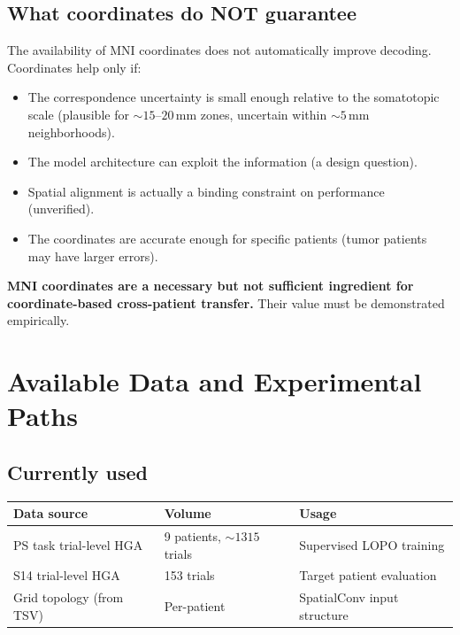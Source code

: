 \documentclass[11pt,letterpaper]{article}
\begin{document}
\subsection{What coordinates do NOT guarantee}

The availability of MNI coordinates does not automatically improve decoding. Coordinates help only if:
\begin{itemize}[leftmargin=2em]
\item The correspondence uncertainty is small enough relative to the somatotopic scale (plausible for ${\sim}15$--$20$\,mm zones, uncertain within ${\sim}5$\,mm neighborhoods).
\item The model architecture can exploit the information (a design question).
\item Spatial alignment is actually a binding constraint on performance (unverified).
\item The coordinates are accurate enough for specific patients (tumor patients may have larger errors).
\end{itemize}

\noindent\textbf{MNI coordinates are a necessary but not sufficient ingredient for coordinate-based cross-patient transfer.} Their value must be demonstrated empirically.


\section{Available Data and Experimental Paths}

\subsection{Currently used}

\begin{table}[h]
\centering\small
\begin{tabular}{@{}lll@{}}
\toprule
\textbf{Data source} & \textbf{Volume} & \textbf{Usage} \\
\midrule
PS task trial-level HGA & 9 patients, ${\sim}1315$ trials & Supervised LOPO training \\
S14 trial-level HGA & 153 trials & Target patient evaluation \\
Grid topology (from TSV) & Per-patient & SpatialConv input structure \\
\bottomrule
\end{tabular}
\end{table}
\end{document}

